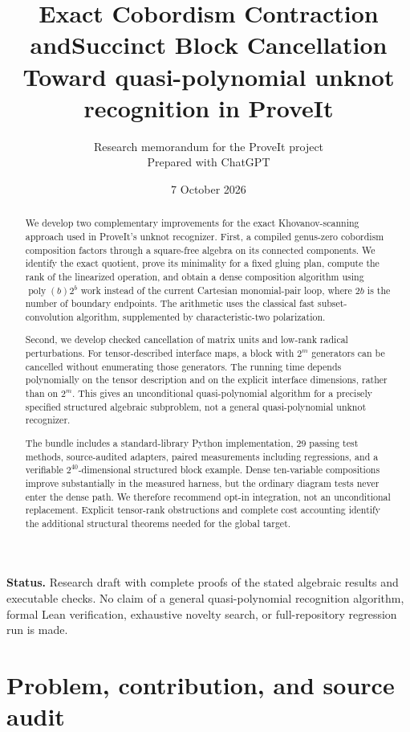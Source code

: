 \documentclass[11pt]{article}
\title{\textbf{Exact Cobordism Contraction and\newline Succinct Block Cancellation}\\[6pt]
\large Toward quasi-polynomial unknot recognition in ProveIt}
\author{Research memorandum for the ProveIt project\\\small Prepared with ChatGPT}
\date{7 October 2026}
\theoremstyle{definition}\newtheorem{definition}[theorem]{Definition}
\theoremstyle{remark}\newtheorem{remark}[theorem]{Remark}
\newcommand{\poly}{\operatorname{poly}}
\begin{document}
\maketitle
\begin{abstract}
We develop two complementary improvements for the exact Khovanov-scanning approach used in ProveIt's unknot recognizer. First, a compiled genus-zero cobordism composition factors through a square-free algebra on its connected components. We identify the exact quotient, prove its minimality for a fixed gluing plan, compute the rank of the linearized operation, and obtain a dense composition algorithm using $\poly(b)2^b$ work instead of the current Cartesian monomial-pair loop, where $2b$ is the number of boundary endpoints. The arithmetic uses the classical fast subset-convolution algorithm, supplemented by characteristic-two polarization.

Second, we develop checked cancellation of matrix units and low-rank radical perturbations. For tensor-described interface maps, a block with $2^m$ generators can be cancelled without enumerating those generators. The running time depends polynomially on the tensor description and on the explicit interface dimensions, rather than on $2^m$. This gives an unconditional quasi-polynomial algorithm for a precisely specified structured algebraic subproblem, not a general quasi-polynomial unknot recognizer.

The bundle includes a standard-library Python implementation, 29 passing test methods, source-audited adapters, paired measurements including regressions, and a verifiable $2^{40}$-dimensional structured block example. Dense ten-variable compositions improve substantially in the measured harness, but the ordinary diagram tests never enter the dense path. We therefore recommend opt-in integration, not an unconditional replacement. Explicit tensor-rank obstructions and complete cost accounting identify the additional structural theorems needed for the global target.
\end{abstract}
\vspace{3pt}
\textbf{Status.} Research draft with complete proofs of the stated algebraic results and executable checks. No claim of a general quasi-polynomial recognition algorithm, formal Lean verification, exhaustive novelty search, or full-repository regression run is made.
\newpage
\tableofcontents
\newpage

\section{Problem, contribution, and source audit}
\label{sec:audit}
\end{document}
